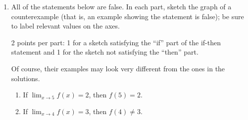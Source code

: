\documentclass{article}
\makeatletter
\providecommand{\check}{}
\renewcommand{\check}{\ifmmode{\text{ \ding{51} }}\else{\ding{51} }\fi}
\let\@href=\href
\renewcommand{\href}[2]{\@href{#1}{\ul{#2}}}
\makeatother
\begin{document}
\begin{enumerate}
\begin{enumerate}
  \end{enumerate}

  \begin{problemonly}
    \check We suggest that you graph the functions $\dfrac{x - 3}{x^2 - 5x + 6}$, $\dfrac{x - 10}{(x - 4)^2}$, and $\dfrac{5}{x^2 - 9}$ using a tool like \href{https://www.desmos.com/calculator}{Desmos} to check your answers. (But be sure your justification doesn't rely on the graphs.) 
\end{problemonly}

\item All of the statements below are false. In each part, sketch the graph of a counterexample (that is, an example showing the statement is false); be sure to label relevant values on the axes.

  \begin{grading} 
    2 points per part: 1 for a sketch satisfying the ``if'' part of the if-then statement and 1 for the sketch not satisfying the ``then'' part.

    Of course, their examples may look very different from the ones in the solutions. 
  \end{grading} 

  \begin{enumerate}
  \item %

    \begin{problem}[\vfill]
      If $\displaystyle \lim_{x \rightarrow 5} f(x) = 2$, then $f(5)=2$.
    \end{problem}

    \begin{solution} 

      \begin{center}
      \end{center}    

    \end{solution} 

  \item
    \begin{problem}[\vfill\newpage]
      If $\displaystyle \lim_{x \to 4} f(x) = 3$, then $f(4) \neq 3$. 
    \end{problem}


\end{enumerate}
\end{enumerate}
\end{document}
